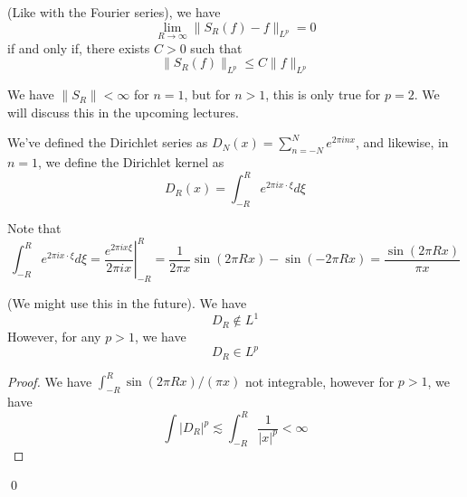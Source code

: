 \begin{proposition}
    (Like with the Fourier series), we have
    \begin{equation*}
        \lim_{R\to\infty}\|S_R(f)-f\|_{L^p}=0
    \end{equation*}
    if and only if, there exists $C>0$ such that
    \begin{equation*}
        \|S_R(f)\|_{L^p}\leq C\|f\|_{L^p}
    \end{equation*}
\end{proposition}
\begin{remark}
    We have $\|S_R\|<\infty$ for $n=1$, but for $n>1$, this is only true for $p=2$. We will discuss this in the upcoming lectures.
\end{remark}
\begin{definition}
    We've defined the Dirichlet series as $D_N(x)=\sum_{n=-N}^Ne^{2\pi inx}$, and likewise, in $n=1$, we define the Dirichlet kernel as
    \begin{equation*}
        D_R(x)=\int_{-R}^R e^{2\pi ix\cdot\xi}d\xi
    \end{equation*}
\end{definition}
Note that
\begin{equation*}
    \int_{-R}^Re^{2\pi ix\cdot\xi}d\xi=\left.\frac{e^{2\pi ix\xi}}{2\pi ix}\right\vert_{-R}^R=\frac{1}{2\pi x}\sin(2\pi Rx)-\sin(-2\pi Rx)=\frac{\sin(2\pi Rx)}{\pi x}
\end{equation*}
\begin{lemma}
    (We might use this in the future). We have
    \begin{equation*}
        D_R\not\in L^1
    \end{equation*}
    However, for any $p>1$, we have
    \begin{equation*}
        D_R\in L^p
    \end{equation*}
\end{lemma}
\begin{proof}
    We have $\int_{-R}^R \sin(2\pi Rx)/(\pi x)$ not integrable, however for $p>1$, we have
    \begin{equation*}
        \int |D_R|^p\lesssim\int_{-R}^R \frac{1}{|x|^p}<\infty
    \end{equation*}
\end{proof}
\qed

